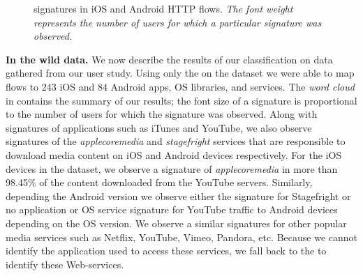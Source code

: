 \begin{figure}
\newline
{}
\caption{\useragent signatures in  iOS and Android HTTP flows. \emph{The font weight represents the number of users for which a particular signature was observed.}}
\label{fig:http-wordcloud}
\end{figure}

\textbf{In the wild data.}
We now describe the results of our classification on data gathered from our user study.
Using only the \useragent on the \mobWild dataset we were able to map flows to 243 iOS and 84 Android apps, OS libraries, and services. 
The \emph{word cloud} in  contains the summary of our results; the font size of a signature is proportional to the number of users for which the signature was observed.
Along with signatures of applications such as iTunes and YouTube, we also observe signatures of the \emph{applecoremedia} and \emph{stagefright} services that are responsible to download media content on iOS and Android devices respectively.
For the iOS devices in the \mobWild dataset, we observe a signature of \emph{applecoremedia} in more than 98.45\% of the content downloaded from the YouTube servers.
Similarly, depending the Android version we observe either the signature for Stagefright\cite{android:stagefright} or no application or OS service signature for YouTube traffic to Android devices depending on the OS version. 
We observe a similar signatures for other popular media services such as Netflix, YouTube, Vimeo, Pandora, etc.
Because we cannot identify the application used to access these services, we fall back to the \httphost to identify these Web-services.

